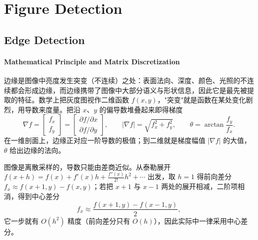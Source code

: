 \section{Figure Detection}

\subsection{Edge Detection}

\paragraph{Mathematical Principle and Matrix Discretization}

边缘是图像中亮度发生突变（不连续）之处：表面法向、深度、颜色、光照的不连续都会形成边缘，而边缘携带了图像中大部分语义与形状信息，因此它是最先被提取的特征。数学上把灰度图视作二维函数 $f(x,y)$，"突变"就是函数在某处变化剧烈，用导数来度量。把沿 $x$、$y$ 的偏导数堆叠起来即得梯度
\[
\nabla f=\begin{bmatrix} f_x \\ f_y \end{bmatrix}
=\begin{bmatrix} \partial f/\partial x \\ \partial f/\partial y \end{bmatrix},
\qquad
|\nabla f|=\sqrt{f_x^2+f_y^2},
\qquad
\theta=\arctan\frac{f_y}{f_x}.
\]
在一维剖面上，边缘正对应一阶导数的极值；到二维就是梯度幅值 $|\nabla f|$ 的大值，$\theta$ 给出边缘的法向。

图像是离散采样的，导数只能由差商近似。从泰勒展开 $f(x+h)=f(x)+f'(x)h+\frac{f''(x)}{2!}h^2+\cdots$ 出发，取 $h=1$ 得前向差分 $f_x\approx f(x+1,y)-f(x,y)$；若把 $x+1$ 与 $x-1$ 两处的展开相减，二阶项相消，得到中心差分
\[
f_x\approx\frac{f(x+1,y)-f(x-1,y)}{2},
\]
它一步就有 $O(h^2)$ 精度（前向差分只有 $O(h)$），因此实际中一律采用中心差分。

